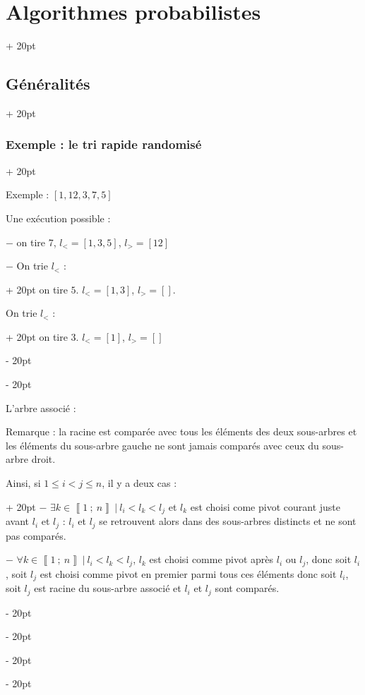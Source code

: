 \documentclass[a4paper, 12pt, twoside]{article}
\newcommand{\nset}[2]{\left\llbracket #1\ ;\ #2 \right\rrbracket}
\renewcommand{\le}{\leqslant}
\newcommand{\ind}[1][20pt]{\advance\leftskip + #1}
\newcommand{\deind}[1][20pt]{\advance\leftskip - #1}
\newenvironment{indt}[2][20pt]{#2 \par \ind[#1]}{\par \deind} %
\newcommand{\1}{\mathbbm 1}
\begin{document}
\begin{indt}{\section{Algorithmes probabilistes}}
\begin{indt}{\subsection{Généralités}}
\begin{indt}{\subsubsection{Exemple : le tri rapide randomisé}}
                \vspace{12pt}
                
                Exemple : $[1, 12, 3, 7, 5]$

                Une exécution possible :

                $-$ on tire 7, $l_< = [1, 3, 5]$, $l_> = [12]$

                \begin{indt}{$-$ On trie $l_<$ :}
                    on tire $5$. $l_< = [1, 3]$, $l_> = []$.

                    \begin{indt}{On trie $l_<$ :}
                        on tire 3. $l_< = [1]$, $l_> = []$
                    \end{indt}
                \end{indt}

                L'arbre associé :
                \begin{center}
                \end{center}

                Remarque : la racine est comparée avec tous les éléments des deux sous-arbres et les éléments du sous-arbre gauche ne sont jamais comparés avec ceux du sous-arbre droit.

                \begin{indt}{Ainsi, si $1 \le i < j \le n$, il y a deux cas :}
                    $-$ $\exists k \in \nset 1 n\ |\ l_i < l_k < l_j$ et $l_k$ est choisi come pivot courant juste avant $l_i$ et $l_j$ : $l_i$ et $l_j$ se retrouvent alors dans des sous-arbres distincts et ne sont pas comparés.

                    $-$ $\forall k \in \nset 1 n\ |\ l_i < l_k < l_j$, $l_k$ est choisi comme pivot après $l_i$ ou $l_j$, donc soit $l_i$, soit $l_j$ est choisi comme pivot en premier parmi tous ces éléments donc soit $l_i$, soit $l_j$ est racine du sous-arbre associé et $l_i$ et $l_j$ sont comparés.
                \end{indt}


\end{indt}
\end{indt}
\end{indt}
\end{document}
